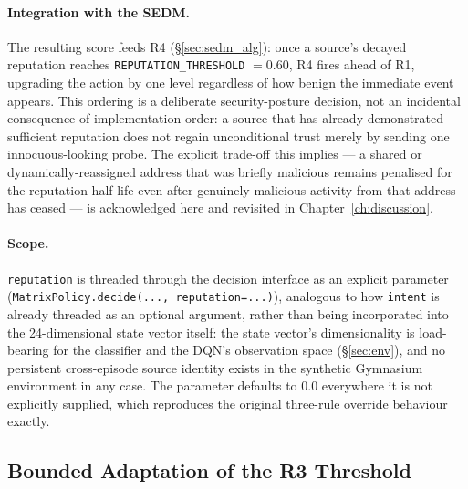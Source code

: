 \paragraph{Integration with the SEDM.}
The resulting score feeds R4 (\S\ref{sec:sedm_alg}): once a source's decayed
reputation reaches \texttt{REPUTATION\_THRESHOLD} $= 0.60$, R4 fires ahead
of R1, upgrading the action by one level regardless of how benign the
immediate event appears. This ordering is a deliberate security-posture
decision, not an incidental consequence of implementation order: a source
that has already demonstrated sufficient reputation does not regain
unconditional trust merely by sending one innocuous-looking probe. The
explicit trade-off this implies — a shared or dynamically-reassigned
address that was briefly malicious remains penalised for the reputation
half-life even after genuinely malicious activity from that address has
ceased — is acknowledged here and revisited in Chapter~\ref{ch:discussion}.

\paragraph{Scope.}
\texttt{reputation} is threaded through the decision interface as an
explicit parameter (\texttt{MatrixPolicy.decide(..., reputation=...)}),
analogous to how \texttt{intent} is already threaded as an optional
argument, rather than being incorporated into the 24-dimensional state
vector itself: the state vector's dimensionality is load-bearing for the
classifier and the DQN's observation space (\S\ref{sec:env}), and no
persistent cross-episode source identity exists in the synthetic Gymnasium
environment in any case. The parameter defaults to 0.0 everywhere it is not
explicitly supplied, which reproduces the original three-rule override
behaviour exactly.

\subsection{Bounded Adaptation of the R3 Threshold}
\label{sec:threshold_controller}

